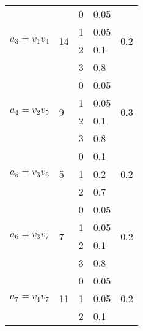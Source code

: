 \begin{longtable}[!ht]{lllll}
		\multicolumn{1}{c}{\multirow{4}{*}{$a_3=v_1 v_4$}} & \multirow{4}{*}{14} & 0  & 0.05 & \multirow{4}{*}{0.2} \\
		\multicolumn{1}{c}{}                               &                     & 1  & 0.05 &                      \\
		\multicolumn{1}{c}{}                               &                     & 2  & 0.1  &                      \\
		\multicolumn{1}{c}{}                               &                     & 3  & 0.8  &                      \\ \hline
		\multicolumn{1}{c}{\multirow{4}{*}{$a_4=v_2 v_5$}} & \multirow{4}{*}{9} & 0  & 0.05 & \multirow{4}{*}{0.3} \\
		\multicolumn{1}{c}{}                               &                     & 1  & 0.05 &                      \\
		\multicolumn{1}{c}{}                               &                     & 2  & 0.1  &                      \\
		\multicolumn{1}{c}{}                               &                     & 3  & 0.8  &                      \\ \hline
		\multirow{3}{*}{$a_5=v_3 v_6$}                     & \multirow{3}{*}{5}  & 0  & 0.1  & \multirow{3}{*}{0.2} \\
		&                     & 1  & 0.2  &                      \\
		&                     & 2  & 0.7  &                      \\ \hline
		\multicolumn{1}{c}{\multirow{4}{*}{$a_6=v_3 v_7$}} & \multirow{4}{*}{7} & 0  & 0.05 & \multirow{4}{*}{0.2} \\
		\multicolumn{1}{c}{}                               &                     & 1  & 0.05 &                      \\
		\multicolumn{1}{c}{}                               &                     & 2  & 0.1  &                      \\
		\multicolumn{1}{c}{}                               &                     & 3  & 0.8  &                      \\ \hline
		\multicolumn{1}{c}{\multirow{4}{*}{$a_7=v_4 v_7$}} & \multirow{4}{*}{11} & 0  & 0.05 & \multirow{4}{*}{0.2} \\
		\multicolumn{1}{c}{}                               &                     & 1  & 0.05 &                      \\
		\multicolumn{1}{c}{}                               &                     & 2  & 0.1  &                      \\

\end{longtable}
